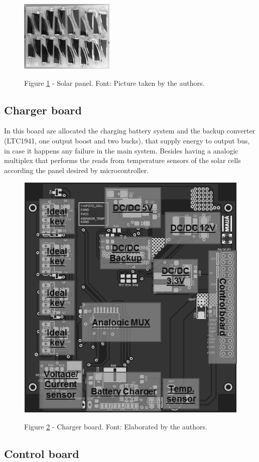 \documentclass[3p]{elsarticle}
\begin{document}
	\begin{figure}[th]
		\label{cells}
		\centering
		\includegraphics[width=0.27\linewidth]{./figs/cells}
			
		\begin{small}
		Figure \ref{cells} - Solar panel. Font: Picture taken by the authors.
		\end{small}		
	\end{figure}
	
\subsection{Charger board}
\label{Charger board}

	In this board are allocated the charging battery system and the backup converter (LTC1941, one output boost and two bucks), that supply energy to output bus, in case it happens any failure in the main system. Besides having a analogic multiplex that performs the reads from temperature sensors of the solar cells according the panel desired by microcontroller.\cite{1941}

	\begin{figure}[th]
		\label{charger}
		\centering
		\includegraphics[width=0.3\linewidth]{./figs/charger}
			
		\begin{small}
		Figure \ref{charger} - Charger board. Font: Elaborated by the authors.
		\end{small}		
	\end{figure}


\subsection{Control board}
\label{Control board}
\end{document}
